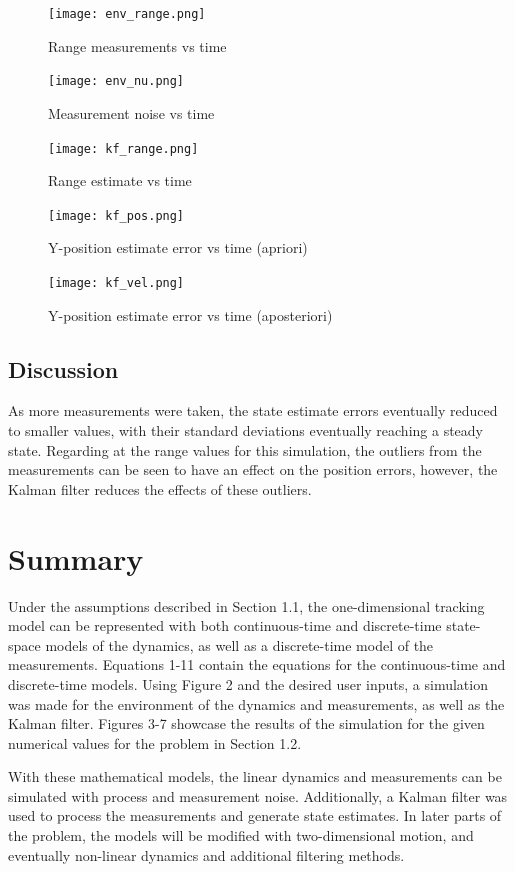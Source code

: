 \documentclass{article}
\begin{document}
\begin{figure}[h]
    \centering
    \texttt{[image: env\_range.png]}
    \caption{Range measurements vs time}
    \label{fig:enter-label}
\end{figure}

\begin{figure}[h]
    \centering
    \texttt{[image: env\_nu.png]}
    \caption{Measurement noise vs time}
    \label{fig:enter-label}
\end{figure}

\begin{figure}[h]
    \centering
    \texttt{[image: kf\_range.png]}
    \caption{Range estimate vs time}
    \label{fig:enter-label}
\end{figure}

\begin{figure}[h]
    \centering
    \texttt{[image: kf\_pos.png]}
    \caption{Y-position estimate error vs time (apriori)}
    \label{fig:enter-label}
\end{figure}

\begin{figure}[h]
    \centering
    \texttt{[image: kf\_vel.png]}
    \caption{Y-position estimate error vs time (aposteriori)}
    \label{fig:enter-label}
\end{figure}

\clearpage
\subsection{Discussion}
As more measurements were taken, the state estimate errors eventually reduced to smaller values, with their standard deviations eventually reaching a steady state. Regarding at the range values for this simulation, the outliers from the measurements can be seen to have an effect on the position errors, however, the Kalman filter reduces the effects of these outliers. 
\section{Summary}

Under the assumptions described in Section 1.1, the one-dimensional tracking model can be represented with both continuous-time and discrete-time state-space models of the dynamics, as well as a discrete-time model of the measurements. Equations 1-11 contain the equations for the continuous-time and discrete-time models. Using Figure 2 and the desired user inputs, a simulation was made for the environment of the dynamics and measurements, as well as the Kalman filter. Figures 3-7 showcase the results of the simulation for the given numerical values for the problem in Section 1.2.
\par
With these mathematical models, the linear dynamics and measurements can be simulated with process and measurement noise. Additionally, a Kalman filter was used to process the measurements and generate state estimates. In later parts of the problem, the models will be modified with two-dimensional motion, and eventually non-linear dynamics and additional filtering methods. 
\end{document}
